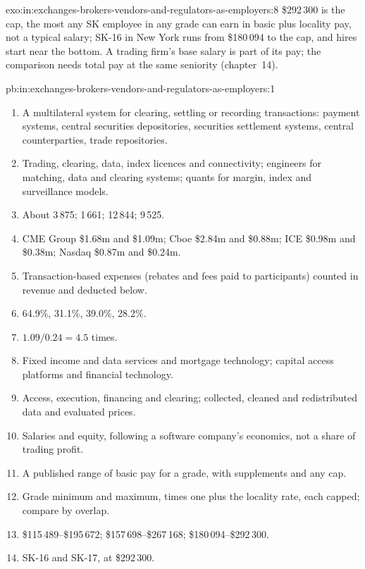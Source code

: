 \begin{solution}{exo:in:exchanges-brokers-vendors-and-regulators-as-employers:8}
\$292\,300 is the cap, the most any SK employee in any grade can earn in basic plus locality pay, not a typical salary;
SK-16 in New York runs from \$180\,094 to the cap, and hires start near the bottom. A trading firm's base salary is part of
its pay; the comparison needs total pay at the same seniority (chapter~14).
\end{solution}

\begin{solution}{pb:in:exchanges-brokers-vendors-and-regulators-as-employers:1}
\begin{enumerate}
\item A multilateral system for clearing, settling or recording transactions: payment systems, central securities
depositories, securities settlement systems, central counterparties, trade repositories.
\item Trading, clearing, data, index licences and connectivity; engineers for matching, data and clearing systems;
quants for margin, index and surveillance models.
\item About 3\,875; 1\,661; 12\,844; 9\,525.
\item CME Group \$1.68m and \$1.09m; Cboe \$2.84m and \$0.88m; ICE \$0.98m and \$0.38m; Nasdaq \$0.87m and \$0.24m.
\item Transaction-based expenses (rebates and fees paid to participants) counted in revenue and deducted below.
\item 64.9\%, 31.1\%, 39.0\%, 28.2\%.
\item $1.09/0.24=4.5$ times.
\item Fixed income and data services and mortgage technology; capital access platforms and financial technology.
\item Access, execution, financing and clearing; collected, cleaned and redistributed data and evaluated prices.
\item Salaries and equity, following a software company's economics, not a share of trading profit.
\item A published range of basic pay for a grade, with supplements and any cap.
\item Grade minimum and maximum, times one plus the locality rate, each capped; compare by overlap.
\item \$115\,489--\$195\,672; \$157\,698--\$267\,168; \$180\,094--\$292\,300.
\item SK-16 and SK-17, at \$292\,300.

\end{enumerate}
\end{solution}
